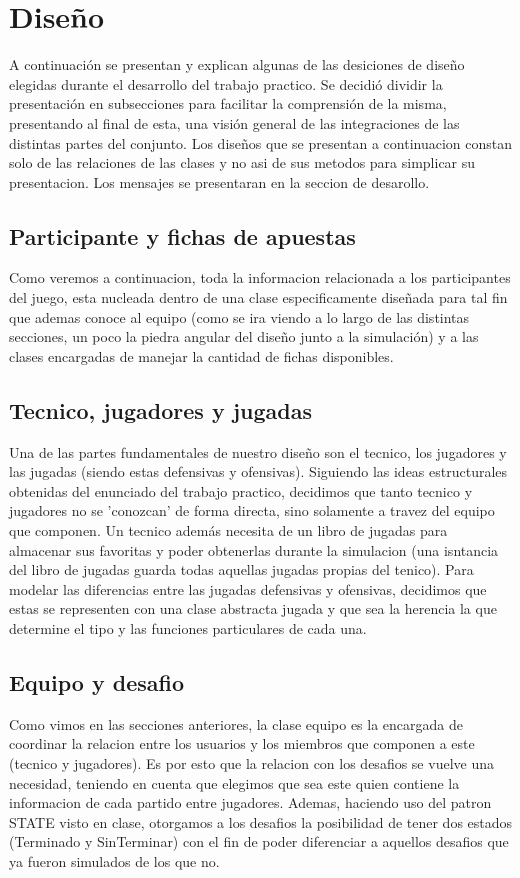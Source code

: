 \section{Diseño}
A continuación se presentan y explican algunas de las desiciones de diseño elegidas durante el desarrollo del trabajo practico.
Se decidió dividir la presentación en subsecciones para facilitar la comprensión de la misma, presentando al final de esta, una visión general de las integraciones de las distintas partes del conjunto.
Los diseños que se presentan a continuacion constan solo de las relaciones de las clases y no asi de sus metodos para simplicar su presentacion.
Los mensajes se presentaran en la seccion de desarollo.

\subsection{Participante y fichas de apuestas}
Como veremos a continuacion, toda la informacion relacionada a los participantes del juego, esta nucleada dentro de una clase especificamente diseñada para tal fin que ademas conoce al equipo (como se ira viendo a lo largo de las distintas secciones, un poco la piedra angular del diseño junto a la simulación) y a las clases encargadas de manejar la cantidad de fichas disponibles.


\subsection{Tecnico, jugadores y jugadas}
Una de las partes fundamentales de nuestro diseño son el tecnico, los jugadores y las jugadas (siendo estas defensivas y ofensivas).
Siguiendo las ideas estructurales obtenidas del enunciado del trabajo practico, decidimos que tanto tecnico y jugadores no se 'conozcan' de forma directa, sino solamente a travez del equipo que componen. Un tecnico además necesita de un libro de jugadas para almacenar sus favoritas y poder obtenerlas durante la simulacion (una isntancia del libro de jugadas guarda todas aquellas jugadas propias del tenico). Para modelar las diferencias entre las jugadas defensivas y ofensivas, decidimos que estas se representen con una clase abstracta jugada y que sea la herencia la que determine el tipo y las funciones particulares de cada una.


\subsection{Equipo y desafio}
Como vimos en las secciones anteriores, la clase equipo es la encargada de coordinar la relacion entre los usuarios y los miembros que componen a este (tecnico y jugadores). Es por esto que la relacion con los desafios se vuelve una necesidad, teniendo en cuenta que elegimos que sea este quien contiene la informacion de cada partido entre jugadores. Ademas, haciendo uso del patron STATE visto en clase, otorgamos a los desafios la posibilidad de tener dos estados (Terminado y SinTerminar) con el fin de poder diferenciar a aquellos desafios que ya fueron simulados de los que no.


